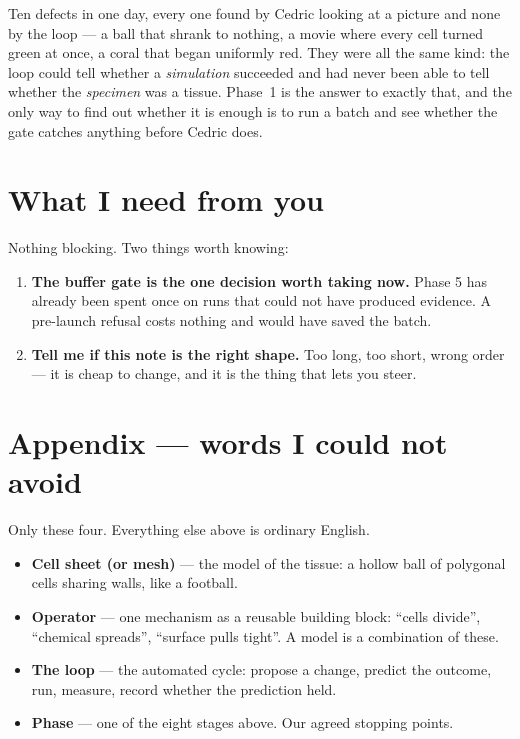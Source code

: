 \documentclass[11pt,a4paper]{article}
\begin{document}
Ten defects in one day, every one found by Cedric looking at a picture and none by the loop --- a
ball that shrank to nothing, a movie where every cell turned green at once, a coral that began
uniformly red. They were all the same kind: the loop could tell whether a \emph{simulation}
succeeded and had never been able to tell whether the \emph{specimen} was a tissue. Phase~1 is the
answer to exactly that, and the only way to find out whether it is enough is to run a batch and see
whether the gate catches anything before Cedric does.

\section{What I need from you}

Nothing blocking. Two things worth knowing:

\begin{enumerate}[leftmargin=1.4em]
\item \textbf{The buffer gate is the one decision worth taking now.} Phase 5 has already been
spent once on runs that could not have produced evidence. A pre-launch refusal costs nothing and
would have saved the batch.
\item \textbf{Tell me if this note is the right shape.} Too long, too short, wrong order --- it is
cheap to change, and it is the thing that lets you steer.
\end{enumerate}

\section*{Appendix --- words I could not avoid}

Only these four. Everything else above is ordinary English.

\begin{itemize}
\item \textbf{Cell sheet (or mesh)} --- the model of the tissue: a hollow ball of polygonal cells
sharing walls, like a football.
\item \textbf{Operator} --- one mechanism as a reusable building block: ``cells divide'',
``chemical spreads'', ``surface pulls tight''. A model is a combination of these.
\item \textbf{The loop} --- the automated cycle: propose a change, predict the outcome, run,
measure, record whether the prediction held.
\item \textbf{Phase} --- one of the eight stages above. Our agreed stopping points.
\end{itemize}
\end{document}
